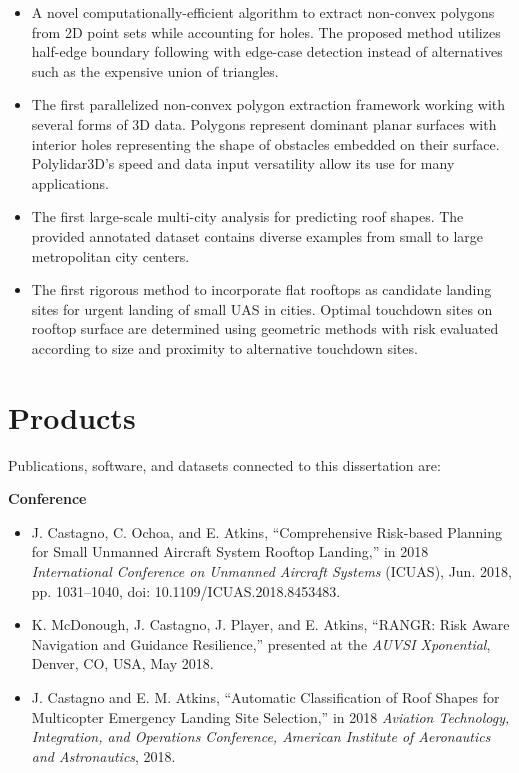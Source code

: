 \begin{itemize}[noitemsep]
      \item A novel computationally-efficient algorithm to extract non-convex polygons from 2D point sets while accounting for holes. The proposed method utilizes half-edge boundary following with edge-case detection instead of alternatives such as the expensive union of triangles.
      \item The first parallelized non-convex polygon extraction framework working with several forms of 3D data. Polygons represent dominant planar surfaces with interior holes representing the shape of obstacles embedded on their surface. Polylidar3D's speed and data input versatility allow its use for many applications.
      \item The first large-scale multi-city analysis for predicting roof shapes. The provided annotated dataset contains diverse examples from small to large metropolitan city centers. 
      \item The first rigorous method to incorporate flat rooftops as candidate landing sites for urgent landing of small UAS in cities.  Optimal touchdown sites on rooftop surface are determined using geometric methods with risk evaluated according to size and proximity to alternative touchdown sites.
\end{itemize}


\section{Products}

Publications, software, and datasets connected to this dissertation are:
\vspace{0.2cm}

\textbf{Conference}
\vspace{0.20cm}
\begin{itemize}[noitemsep]
    \item J. Castagno, C. Ochoa, and E. Atkins, ``Comprehensive Risk-based Planning for Small Unmanned Aircraft System Rooftop Landing,” in 2018 \emph{International Conference on Unmanned Aircraft Systems} (ICUAS), Jun. 2018, pp. 1031–1040, doi: 10.1109/ICUAS.2018.8453483.
    \item K. McDonough, J. Castagno, J. Player, and E. Atkins, ``RANGR: Risk Aware Navigation and Guidance Resilience,” presented at the \emph{AUVSI Xponential}, Denver, CO, USA, May 2018.
	\item J. Castagno and E. M. Atkins, ``Automatic Classification of Roof Shapes for Multicopter Emergency Landing Site Selection,” in 2018 \emph{Aviation Technology, Integration, and Operations Conference, American Institute of Aeronautics and Astronautics}, 2018.
\end{itemize}

